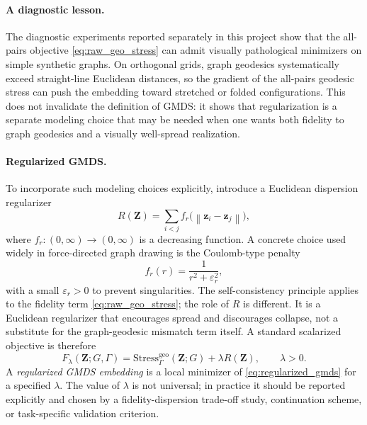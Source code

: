 \documentclass[11pt]{article}
\newcommand{\bz}{\mathbf{z}}
\newcommand{\bZ}{\mathbf{Z}}
\newcommand{\norm}[1]{\left\|#1\right\|}
\newcommand{\Stress}{\mathrm{Stress}}
\theoremstyle{definition}
\theoremstyle{plain}
\theoremstyle{remark}
\begin{document}
\paragraph{A diagnostic lesson.}
The diagnostic experiments reported separately in this project show that the
all-pairs objective \cref{eq:raw_geo_stress} can admit visually pathological
minimizers on simple synthetic graphs.  On orthogonal grids, graph geodesics
systematically exceed straight-line Euclidean distances, so the gradient of the
all-pairs geodesic stress can push the embedding toward stretched or folded
configurations.  This does not invalidate the definition of GMDS: it shows that
regularization is a separate modeling choice that may be needed when one wants
both fidelity to graph geodesics and a visually well-spread realization.

\paragraph{Regularized GMDS.}
To incorporate such modeling choices explicitly, introduce a Euclidean
dispersion regularizer
\begin{equation}
  R(\bZ) = \sum_{i < j} f_r\bigl(\norm{\bz_i - \bz_j}\bigr),
  \label{eq:repulsive_regularizer}
\end{equation}
where $f_r : (0,\infty) \to (0,\infty)$ is a decreasing function.  A
concrete choice used widely in force-directed graph drawing is the Coulomb-type
penalty
\begin{equation}
  f_r(r) = \frac{1}{r^2 + \varepsilon_r^2},
  \label{eq:coulomb_regularizer}
\end{equation}
with a small $\varepsilon_r > 0$ to prevent singularities.  The
self-consistency principle applies to the fidelity term
\cref{eq:raw_geo_stress}; the role of $R$ is different.  It is a Euclidean
regularizer that encourages spread and discourages collapse, not a substitute
for the graph-geodesic mismatch term itself.  A standard scalarized objective
is therefore
\begin{equation}
  F_\lambda(\bZ; G,\Gamma)
  = \Stress^{\mathrm{geo}}_{\Gamma}(\bZ; G) + \lambda R(\bZ),
  \qquad \lambda > 0.
  \label{eq:regularized_gmds}
\end{equation}
A \emph{regularized GMDS embedding} is a local minimizer of
\cref{eq:regularized_gmds} for a specified $\lambda$.  The value of
$\lambda$ is not universal; in practice it should be reported explicitly and
chosen by a fidelity-dispersion trade-off study, continuation scheme, or
task-specific validation criterion.
\end{document}
